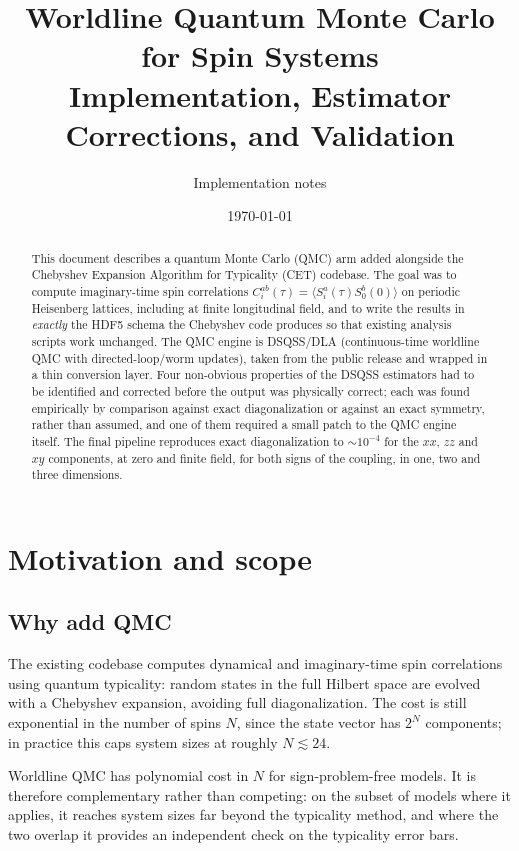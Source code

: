 \documentclass[11pt,a4paper]{article}
\title{\textbf{Worldline Quantum Monte Carlo for Spin Systems}\\[0.3em]
       \large Implementation, Estimator Corrections, and Validation}
\author{Implementation notes}
\date{\today}
\begin{document}
\maketitle

\begin{abstract}
This document describes a quantum Monte Carlo (QMC) arm added alongside the
Chebyshev Expansion Algorithm for Typicality (CET) codebase. The goal was to
compute imaginary-time spin correlations
$C^{ab}_{i}(\tau)=\langle S^a_i(\tau) S^b_0(0)\rangle$ on periodic Heisenberg
lattices, including at finite longitudinal field, and to write the results in
\emph{exactly} the HDF5 schema the Chebyshev code produces so that existing
analysis scripts work unchanged. The QMC engine is DSQSS/DLA
(continuous-time worldline QMC with directed-loop/worm updates), taken from the
public release and wrapped in a thin conversion layer. Four non-obvious
properties of the DSQSS estimators had to be identified and corrected before
the output was physically correct; each was found empirically by comparison
against exact diagonalization or against an exact symmetry, rather than
assumed, and one of them required a small patch to the QMC engine itself. The
final pipeline reproduces exact diagonalization to $\sim 10^{-4}$ for the $xx$,
$zz$ and $xy$ components, at zero and finite field, for both signs of the
coupling, in one, two and three dimensions.
\end{abstract}

\tableofcontents

\newpage

\section{Motivation and scope}

\subsection{Why add QMC}

The existing codebase computes dynamical and imaginary-time spin correlations
using quantum typicality: random states in the full Hilbert space are evolved
with a Chebyshev expansion, avoiding full diagonalization. The cost is still
exponential in the number of spins $N$, since the state vector has $2^N$
components; in practice this caps system sizes at roughly $N\lesssim 24$.

Worldline QMC has polynomial cost in $N$ for sign-problem-free models. It is
therefore complementary rather than competing: on the subset of models where it
applies, it reaches system sizes far beyond the typicality method, and where the
two overlap it provides an independent check on the typicality error bars.
\end{document}
